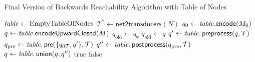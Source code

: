 \begin{algorithm}[htb]
\caption{Final Version of Backwards Reachability Algorithm with Table of Nodes}\label{alg:bw_wwa_final}
\begin{algorithmic}[1]\smallskip
{}
\State $\mathit{table} \gets \text{EmptyTableOfNodes}$
\color{blue!75}
\State $\mathcal{T}^{*} \gets \textsf{net2transducers}(N)$
\color{black}
\State $q_{0} \gets  \mathit{table}.\textsf{encode}(M_{0})$
\State $q \gets \mathit{table}.\textsf{encodeUpwardClosed}(M)$
\State $q_{\text{old}} \gets q_{\emptyset}$
	\State $q_{\text{old}}  \gets q$
	\color{blue!75}
\State $q' \gets \mathit{table}.\operatorname{\textsf{preprocess}}(q,\mathcal{T})$
	\State $q_{\text{pre}} \gets \mathit{table}.\operatorname{\textsf{pre}}(\{q_{0\mathcal{T}},q'\},\mathcal{T})$
	\State $q'' \gets \mathit{table}.\operatorname{\textsf{postprocess}}(q_{\text{pre}},\mathcal{T})$
	\State $q \gets \mathit{table}.\operatorname{\textsf{union}}(q, q'')$
	\EndFor
	\color{black}
	\Return true
\EndIf
{}
    \Return false
\EndIf
\EndWhile
\smallskip
\end{algorithmic}
\end{algorithm}


